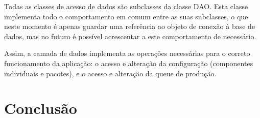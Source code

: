 \documentclass{llncs}
\begin{document}
Todas as classes de acesso de dados são subclasses da classe DAO. Esta classe implementa todo o comportamento em comum entre as suas subclasses, o que neste momento é apenas guardar uma referência ao objeto de conexão à base de dados, mas no futuro é possível acrescentar a este comportamento de necessário.

Assim, a camada de dados implementa as operações necessárias para o correto funcionamento da aplicação: o acesso e alteração da configuração (componentes individuais e pacotes), e o acesso e alteração da queue de produção.

\clearpage
\section{Conclusão}
\end{document}
